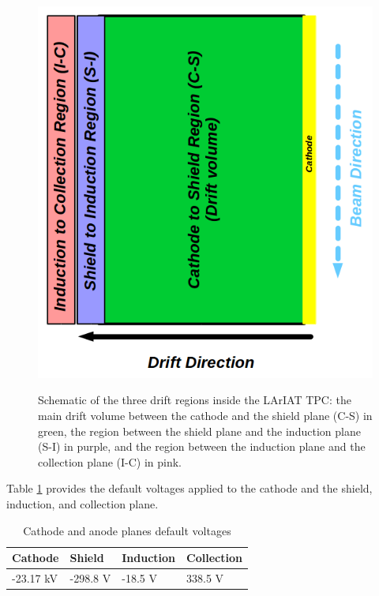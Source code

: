 \begin{figure}[htb]
\centering
\includegraphics[scale=0.35]{Chapter-3/Images/DriftRegions.png}\\
\caption{Schematic of the three drift regions inside the LArIAT TPC: the main drift volume between the cathode and the shield plane (C-S) in green, the region between the shield plane and the induction plane (S-I) in purple, and the region between the induction plane and the collection plane (I-C) in pink.}
\label{fig:driftregions}
\end{figure}

Table \ref{tab:voltages} provides the default voltages applied to the cathode and the shield, induction, and collection plane.  

\begin{table}[htpb]
\centering
\caption{Cathode and anode planes default voltages}
\label{tab:voltages}
\begin{tabular}{llll}
\hline
\multicolumn{1}{|l|}{ Cathode} & 
\multicolumn{1}{|l|}{ Shield} & \multicolumn{1}{l|}{ Induction} & \multicolumn{1}{l|}{ Collection}  \\ \hline
\multicolumn{1}{|l|}{-23.17 kV} &
\multicolumn{1}{|l|}{-298.8 V} & \multicolumn{1}{l|}{-18.5 V}      & \multicolumn{1}{l|}{338.5 V} \\ \hline
\end{tabular}
\end{table}


